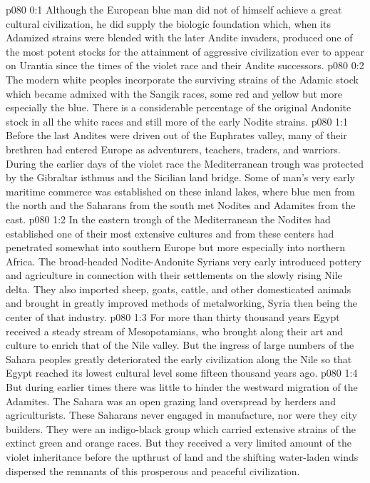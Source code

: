 \author{Archangel}
\vs p080 0:1 Although the European blue man did not of himself achieve a great cultural civilization, he did supply the biologic foundation which, when its Adamized strains were blended with the later Andite invaders, produced one of the most potent stocks for the attainment of aggressive civilization ever to appear on Urantia since the times of the violet race and their Andite successors.
\vs p080 0:2 The modern white peoples incorporate the surviving strains of the Adamic stock which became admixed with the Sangik races, some red and yellow but more especially the blue. There is a considerable percentage of the original Andonite stock in all the white races and still more of the early Nodite strains.
\vs p080 1:1 Before the last Andites were driven out of the Euphrates valley, many of their brethren had entered Europe as adventurers, teachers, traders, and warriors. During the earlier days of the violet race the Mediterranean trough was protected by the Gibraltar isthmus and the Sicilian land bridge. Some of man’s very early maritime commerce was established on these inland lakes, where blue men from the north and the Saharans from the south met Nodites and Adamites from the east.
\vs p080 1:2 In the eastern trough of the Mediterranean the Nodites had established one of their most extensive cultures and from these centers had penetrated somewhat into southern Europe but more especially into northern Africa. The broad\hyp{}headed Nodite\hyp{}Andonite Syrians very early introduced pottery and agriculture in connection with their settlements on the slowly rising Nile delta. They also imported sheep, goats, cattle, and other domesticated animals and brought in greatly improved methods of metalworking, Syria then being the center of that industry.
\vs p080 1:3 For more than thirty thousand years Egypt received a steady stream of Mesopotamians, who brought along their art and culture to enrich that of the Nile valley. But the ingress of large numbers of the Sahara peoples greatly deteriorated the early civilization along the Nile so that Egypt reached its lowest cultural level some fifteen thousand years ago.
\vs p080 1:4 But during earlier times there was little to hinder the westward migration of the Adamites. The Sahara was an open grazing land overspread by herders and agriculturists. These Saharans never engaged in manufacture, nor were they city builders. They were an indigo\hyp{}black group which carried extensive strains of the extinct green and orange races. But they received a very limited amount of the violet inheritance before the upthrust of land and the shifting water\hyp{}laden winds dispersed the remnants of this prosperous and peaceful civilization.
